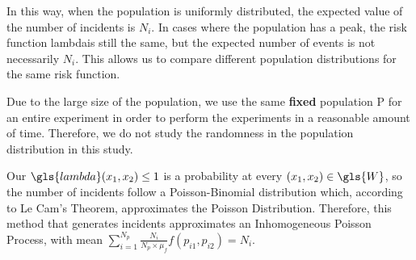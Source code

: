 In this way,
when the population is uniformly distributed,
the expected value of the number of \glspl{incident} is $N_i$.
In cases where the population has a peak,
the risk function \gls{lambda}\dotdot is still the same,
but the expected number of \glspl{event} is not necessarily $N_i$.
This allows us to compare different population distributions for the same risk function.

Due to the large size of the population,
we use the same \textbf{fixed} population \gls{P} for an entire experiment
in order to perform the experiments in a reasonable amount of time.
Therefore,
we do not study the randomness in the population distribution in this study.

Our $\gls{lambda}(x_1, x_2) \leq 1$ is a probability at every $(x_1, x_2) \in \gls{W}$,
so the number of \glspl{incident} follow a Poisson-Binomial distribution which,
according to Le Cam's Theorem, approximates the Poisson Distribution.
Therefore, this method that generates \glspl{incident} approximates an Inhomogeneous Poisson Process,
with mean $\sum\limits_{i=1}^{N_p}{\frac{N_i}{N_p \times \mu_f} f(p_{i1}, p_{i2})} = N_i$.
